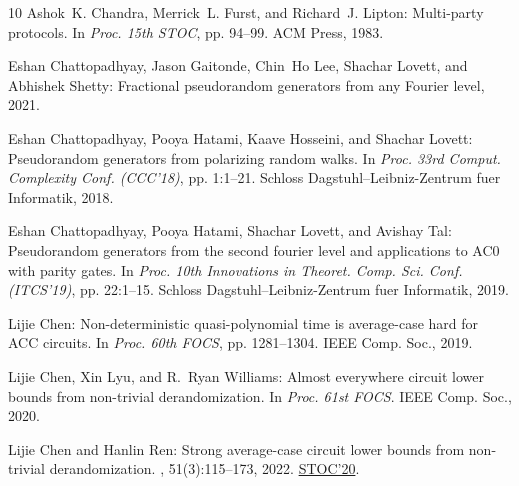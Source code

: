 \documentclass[11pt]{article}
\begin{document}
\begin{thebibliography}{10}
{\sc Ashok~K. Chandra, Merrick~L. Furst, and Richard~J. Lipton}: Multi-party
  protocols.
\newblock In {\em Proc. 15th STOC}, pp. 94--99. ACM Press, 1983.
\newblock [\epfmtdoi{10.1145/800061.808737}]

{\sc Eshan Chattopadhyay, Jason Gaitonde, Chin~Ho Lee, Shachar Lovett, and
  Abhishek Shetty}: Fractional pseudorandom generators from any {F}ourier
  level, 2021.

{\sc Eshan Chattopadhyay, Pooya Hatami, Kaave Hosseini, and Shachar Lovett}:
  Pseudorandom generators from polarizing random walks.
\newblock In {\em Proc. 33rd Comput. Complexity Conf. (CCC'18)}, pp. 1:1--21.
  Schloss Dagstuhl--Leibniz-Zentrum fuer Informatik, 2018.

{\sc Eshan Chattopadhyay, Pooya Hatami, Shachar Lovett, and Avishay Tal}:
  Pseudorandom generators from the second fourier level and applications to
  {AC0} with parity gates.
\newblock In {\em Proc. 10th Innovations in Theoret. Comp. Sci. Conf.
  (ITCS'19)}, pp. 22:1--15. Schloss Dagstuhl--Leibniz-Zentrum fuer Informatik,
  2019.

{\sc Lijie Chen}: Non-deterministic quasi-polynomial time is average-case hard
  for {ACC} circuits.
\newblock In {\em Proc. 60th FOCS}, pp. 1281--1304. IEEE Comp. Soc., 2019.

{\sc Lijie Chen, Xin Lyu, and R.~Ryan Williams}: Almost everywhere circuit
  lower bounds from non-trivial derandomization.
\newblock In {\em Proc. 61st FOCS}. IEEE Comp. Soc., 2020.

{\sc Lijie Chen and Hanlin Ren}: Strong average-case circuit lower bounds from
  non-trivial derandomization.
, 51(3):115--173, 2022.
\newblock \prelim \href{https://doi.org/10.1145/3357713.3384279}{STOC'20}.
\newblock [\epfmtdoi{10.1137/20M1364886}]


\end{thebibliography}
\end{document}
